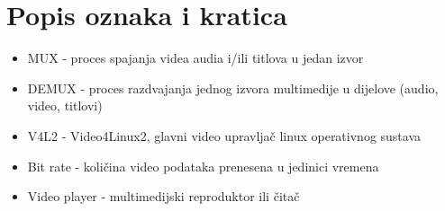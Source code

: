 \section*{Popis oznaka i kratica}

\begin{itemize}
  \item MUX - proces spajanja videa audia i/ili titlova u jedan izvor \label{sct:mux} \cite{ffmpegBook}
  \item DEMUX - proces razdvajanja jednog izvora multimedije u dijelove (audio, video, titlovi) \label{sct:demux} \cite{ffmpegBook}
  \item V4L2 - Video4Linux2, glavni video upravljač linux operativnog sustava \cite{linuxKernelDocs} \label{sct:v4l2}
  \item Bit rate - količina video podataka prenesena u jedinici vremena \cite{ffmpegBook} \label{sct:bitRate}
  \item Video player - multimedijski reproduktor ili čitač \label{sct:videoPlayer}
\end{itemize}